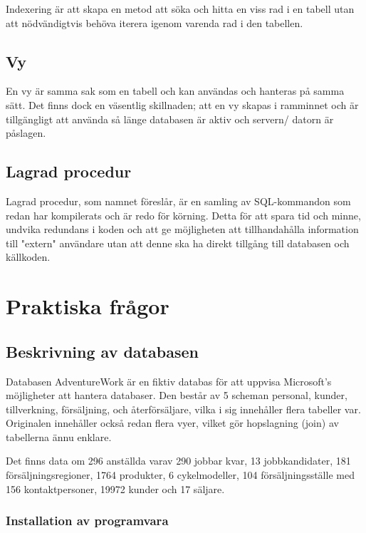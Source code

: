\documentclass[]{article}
\begin{document}
Indexering är att skapa en metod att söka och hitta en viss rad i en tabell utan att nödvändigtvis behöva iterera igenom varenda rad i den tabellen.



\subsection{Vy}

En vy är samma sak som en tabell och kan användas och hanteras på samma sätt. Det finns dock en väsentlig skillnaden; att en vy skapas i ramminnet och är tillgängligt att använda så länge databasen är aktiv och servern/ datorn är påslagen.



\subsection{Lagrad procedur}

Lagrad procedur, som namnet föreslår, är en samling av SQL-kommandon som redan har kompilerats och är redo för körning. Detta för att spara tid och minne, undvika redundans i koden och att ge möjligheten att tillhandahålla information till "extern" användare utan att denne ska ha direkt tillgång till databasen och källkoden.



\section{Praktiska frågor}


\subsection{Beskrivning av databasen}

Databasen AdventureWork är en fiktiv databas för att uppvisa Microsoft's möjligheter att hantera databaser. Den består av 5 scheman personal, kunder, tillverkning, försäljning, och återförsäljare, vilka i sig innehåller flera tabeller var. Originalen innehåller också redan flera vyer, vilket gör hopslagning (join) av tabellerna ännu enklare.

Det finns data om 296 anställda varav 290 jobbar kvar, 13 jobbkandidater, 181 försäljningsregioner, 1764 produkter, 6 cykelmodeller, 104 försäljningsställe med 156 kontaktpersoner, 19972 kunder och 17 säljare.



\subsubsection{Installation av programvara}
\end{document}
